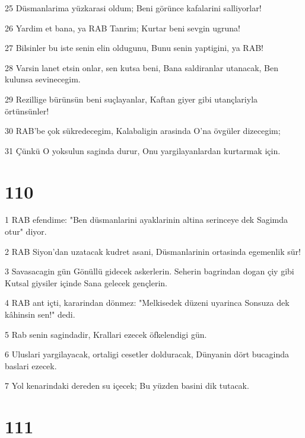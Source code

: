 \par 25 Düsmanlarima yüzkarasi oldum; Beni görünce kafalarini salliyorlar!
\par 26 Yardim et bana, ya RAB Tanrim; Kurtar beni sevgin ugruna!
\par 27 Bilsinler bu iste senin elin oldugunu, Bunu senin yaptigini, ya RAB!
\par 28 Varsin lanet etsin onlar, sen kutsa beni, Bana saldiranlar utanacak, Ben kulunsa sevinecegim.
\par 29 Rezillige bürünsün beni suçlayanlar, Kaftan giyer gibi utançlariyla örtünsünler!
\par 30 RAB'be çok sükredecegim, Kalabaligin arasinda O'na övgüler dizecegim;
\par 31 Çünkü O yoksulun saginda durur, Onu yargilayanlardan kurtarmak için.

\chapter{110}

\par 1 RAB efendime: "Ben düsmanlarini ayaklarinin altina serinceye dek Sagimda otur" diyor.
\par 2 RAB Siyon'dan uzatacak kudret asani, Düsmanlarinin ortasinda egemenlik sür!
\par 3 Savasacagin gün Gönüllü gidecek askerlerin. Seherin bagrindan dogan çiy gibi Kutsal giysiler içinde Sana gelecek gençlerin.
\par 4 RAB ant içti, kararindan dönmez: "Melkisedek düzeni uyarinca Sonsuza dek kâhinsin sen!" dedi.
\par 5 Rab senin sagindadir, Krallari ezecek öfkelendigi gün.
\par 6 Uluslari yargilayacak, ortaligi cesetler dolduracak, Dünyanin dört bucaginda baslari ezecek.
\par 7 Yol kenarindaki dereden su içecek; Bu yüzden basini dik tutacak.

\chapter{111}

